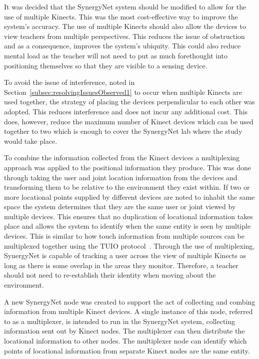 \documentclass[link]{IWCOMP}
\begin{document}
It was decided that the SynergyNet system should be modified to allow for the use of multiple Kinects.
This was the most cost-effective way to improve the system's accuracy.
The use of multiple Kinects should also allow the devices to view teachers from multiple perspectives.
This reduces the issue of obstruction and as a consequence, improves the system's ubiquity.
This could also reduce mental load as the teacher will not need to put as much forethought into positioning themselves so that they are visible to a sensing device.

To avoid the issue of interference, noted in Section~\ref{subsec:resolvingIssuesObserved1} to occur when multiple Kinects are used together, the strategy of placing the devices perpendicular to each other was adopted.
This reduces interference and does not incur any additional cost.
This does, however, reduce the maximum number of Kinect devices which can be used together to two which is enough to cover the SynergyNet lab where the study would take place.

To combine the information collected from the Kinect devices a multiplexing approach was applied to the positional information they produce.
This was done through taking the user and joint location information from the devices and transforming them to be relative to the environment they exist within.
If two or more locational points supplied by different devices are noted to inhabit the same space the system determines that they are the same user or joint viewed by multiple devices.
This ensures that no duplication of locational information takes place and allows the system to identify when the same entity is seen by multiple devices.
This is similar to how touch information from multiple sources can be multiplexed together using the TUIO protocol~\cite{Kaltenbrunner2009}.
Through the use of multiplexing, SynergyNet is capable of tracking a user across the view of multiple Kinects as long as there is some overlap in the areas they monitor.
Therefore, a teacher should not need to re-establish their identity when moving about the environment.

A new SynergyNet node was created to support the act of collecting and combing information from multiple Kinect devices.
A single instance of this node, referred to as a multiplexer, is intended to run in the SynergyNet system, collecting information sent out by Kinect nodes.
The multiplexer can then distribute the locational information to other nodes.
The multiplexer node can identify which points of locational information from separate Kinect nodes are the same entity.
\end{document}

